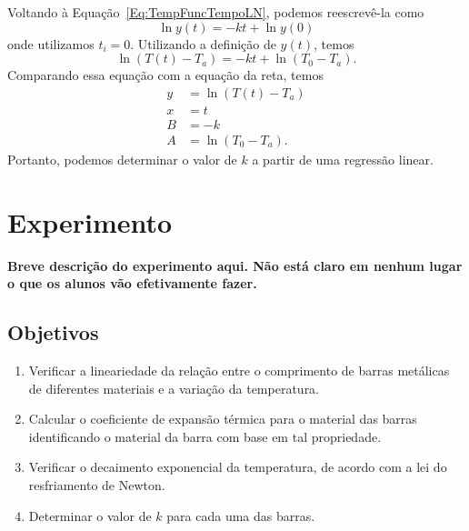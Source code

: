 Voltando à Equação~\ref{Eq:TempFuncTempoLN}, podemos reescrevê-la como
\begin{equation}
	\ln y(t) = -kt + \ln y(0)
\end{equation}
%
onde utilizamos $t_i = 0$. Utilizando a definição de $y(t)$, temos
\begin{equation}
	\ln (T(t) - T_a) = - kt + \ln(T_0 - T_a).
\end{equation}
%
Comparando essa equação com a equação da reta, temos
\begin{subequations}\label{Eq:LinResfriamentoNewton}
\begin{align}
	y &= \ln (T(t) - T_a) \\
	x &= t \\
	B &= -k \\
	A &= \ln(T_0 - T_a).
\end{align}
\end{subequations}
%
Portanto, podemos determinar o valor de $k$ a partir de uma regressão linear.

\section{Experimento}

\textbf{Breve descrição do experimento aqui. Não está claro em nenhum lugar o que os alunos vão efetivamente fazer.}

\subsection{Objetivos}
\label{Sec:ObjetivosDilatacaoLinear}

\begin{enumerate}
	\item Verificar a lineariedade da relação entre o comprimento de barras metálicas de diferentes materiais e a variação da temperatura.
	\item Calcular o coeficiente de expansão térmica para o material das barras identificando o material da barra com base em tal propriedade.
	\item Verificar o decaimento exponencial da temperatura, de acordo com a lei do resfriamento de Newton.
	\item Determinar o valor de $k$ para cada uma das barras.
\end{enumerate}

